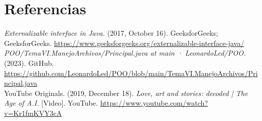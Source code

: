 \documentclass[12pt]{article}
\begin{document}
  \section*{Referencias}
  \textit{Externalizable interface in Java.} (2017, October 16). GeeksforGeeks; GeeksforGeeks. \url{https://www.geeksforgeeks.org/externalizable-interface-java/} \\

  \textit{POO/TemaVI.ManejoArchivos/Principal.java at main · LeonardoLed/POO.} (2023). GitHub. \url{https://github.com/LeonardoLed/POO/blob/main/TemaVI.ManejoArchivos/Principal.java} \\

  YouTube Originals. (2019, December 18). \textit{Love, art and stories: decoded | The Age of A.I.} [Video]. YouTube. \url{https://www.youtube.com/watch?v=Kr1fmKVY3cA}
\end{document}
